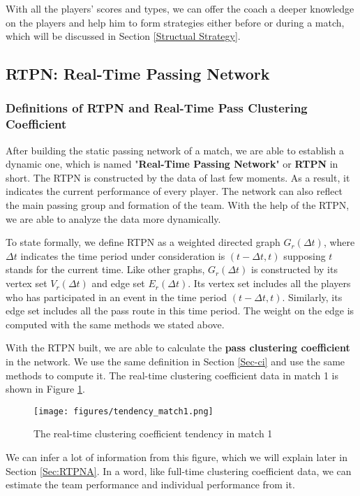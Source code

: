 \documentclass{mcmthesis}
\begin{document}
With all the players' scores and types, we can offer the coach a deeper knowledge on the players and help him to form strategies either before or during a match, which will be discussed in Section \ref{Structual Strategy}.

\subsection{RTPN: Real-Time Passing Network}\label{Sec:RTPN}
\subsubsection{Definitions of RTPN and Real-Time Pass Clustering Coefficient}\label{Sec:RTPN1}
After building the static passing network of a match, we are able to  establish a dynamic one, which is named "\textbf{Real-Time Passing Network}" or \textbf{RTPN} in short. The RTPN is constructed by the data of last few moments. As a result, it indicates the current performance of every player. The network can also reflect the main passing group and formation of the team. With the help of the RTPN, we are able to analyze the data more dynamically.

To state formally, we define RTPN as a weighted directed graph $G_r(\Delta{t})$, where $\Delta{t}$ indicates the time period under consideration is $(t - \Delta{t}, t)$ supposing $t$ stands for the current time. Like other graphs, $G_r(\Delta{t})$ is constructed by its vertex set $V_r(\Delta{t})$ and edge set $E_r(\Delta{t})$. Its vertex set includes all the players who has participated in an event in the time period $(t-\Delta{t},t)$. Similarly, its edge set includes all the pass route in this time period. The weight on the edge is computed  with the same methods we stated above.

 With the RTPN built, we are able to calculate the \textbf{pass clustering coefficient} in the network. We use the same definition in Section \ref{Sec-ci} and use the same methods to compute it. The real-time clustering coefficient data in match 1 is shown in Figure \ref{tendency1}.

\begin{figure}[htbp]
    \centering
    \texttt{[image: figures/tendency\_match1.png]}
    \caption{The real-time clustering coefficient tendency in match 1}
    \label{tendency1}
\end{figure}

 We can infer a lot of information from this figure, which we will explain later in Section \ref{Sec:RTPNA}. In a word, like full-time clustering coefficient data, we can estimate the team performance and individual performance from it.
\end{document}
